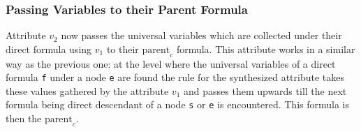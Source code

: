 \subsubsection{Passing Variables to their Parent Formula}
Attribute $v_2$ now passes  the universal variables which are collected under their direct formula using  $v_1$ to their $\text{parent}_c$ formula.
This attribute works in a similar way as the previous one:
at the level where the universal variables of a direct formula \texttt{f} under a node \texttt{e} are found the rule for the synthesized attribute 
takes these values gathered by the attribute $v_1$ and 
passes them upwards till the next formula being 
direct descendant of a node \texttt{s} or \texttt{e} is encountered. This formula is then the $\text{parent}_c$.
%
%
% 


